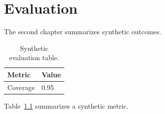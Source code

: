\chapter{Evaluation}
The second chapter summarizes synthetic outcomes.

\begin{table}[h]
\centering
\begin{tabular}{ll}
Metric & Value \\
\hline
Coverage & 0.95 \\
\end{tabular}
\caption{Synthetic evaluation table.}
\label{tab:synthetic-eval}
\end{table}

Table~\ref{tab:synthetic-eval} summarizes a synthetic metric.
